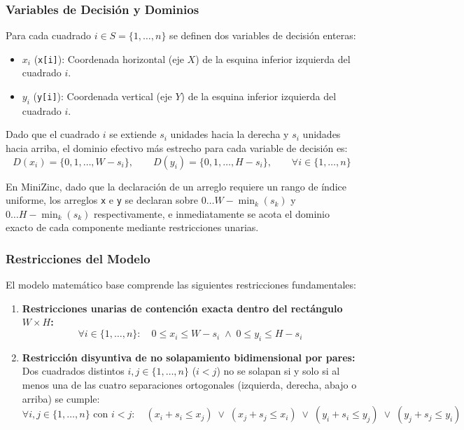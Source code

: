 \subsubsection{Variables de Decisión y Dominios}
Para cada cuadrado $i \in S = \{1, \dots, n\}$ se definen dos variables de decisión enteras:
\begin{itemize}
    \item $x_i$ (\texttt{x[i]}): Coordenada horizontal (eje $X$) de la esquina inferior izquierda del cuadrado $i$.
    \item $y_i$ (\texttt{y[i]}): Coordenada vertical (eje $Y$) de la esquina inferior izquierda del cuadrado $i$.
\end{itemize}

Dado que el cuadrado $i$ se extiende $s_i$ unidades hacia la derecha y $s_i$ unidades hacia arriba, el dominio efectivo más estrecho para cada variable de decisión es:
\[
    D(x_i) = \{0, 1, \dots, W - s_i\}, \qquad D(y_i) = \{0, 1, \dots, H - s_i\}, \qquad \forall i \in \{1, \dots, n\}
\]

En MiniZinc, dado que la declaración de un arreglo requiere un rango de índice uniforme, los arreglos \texttt{x} e \texttt{y} se declaran sobre $0 \dots W - \min_k(s_k)$ y $0 \dots H - \min_k(s_k)$ respectivamente, e inmediatamente se acota el dominio exacto de cada componente mediante restricciones unarias.

\subsubsection{Restricciones del Modelo}
El modelo matemático base comprende las siguientes restricciones fundamentales:

\begin{enumerate}
    \item \textbf{Restricciones unarias de contención exacta dentro del rectángulo $W \times H$:}
    \[
        \forall i \in \{1, \dots, n\}: \quad 0 \le x_i \le W - s_i \;\land\; 0 \le y_i \le H - s_i
    \]

    \item \textbf{Restricción disyuntiva de no solapamiento bidimensional por pares:}
    Dos cuadrados distintos $i, j \in \{1, \dots, n\}$ ($i < j$) no se solapan si y solo si al menos una de las cuatro separaciones ortogonales (izquierda, derecha, abajo o arriba) se cumple:
    \[
        \forall i, j \in \{1, \dots, n\} \text{ con } i < j: \quad
        (x_i + s_i \le x_j) \;\lor\; (x_j + s_j \le x_i) \;\lor\; (y_i + s_i \le y_j) \;\lor\; (y_j + s_j \le y_i)
    \]
\end{enumerate}

